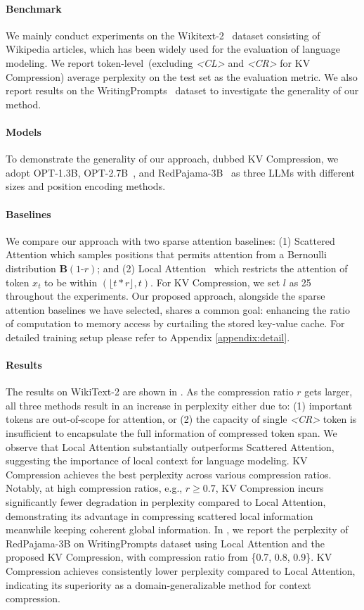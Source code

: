 \paragraph{Benchmark} We mainly conduct experiments on the Wikitext-2~\cite{wikitext2} dataset consisting of Wikipedia articles, which has been widely used for the evaluation of language modeling. We report token-level~(excluding \textit{<CL>} and \textit{<CR>} for KV Compression) average perplexity on the test set as the evaluation metric. We also report results on the WritingPrompts~\cite{wp} dataset to investigate the generality of our method.
\paragraph{Models} To demonstrate the generality of our approach, dubbed KV Compression, we adopt OPT-1.3B, OPT-2.7B~\cite{opt}, and RedPajama-3B~\cite{redpajama} as three LLMs with different sizes and position encoding methods.
\paragraph{Baselines} We compare our approach with two sparse attention baselines: (1) Scattered Attention which samples positions that permits attention from a Bernoulli distribution $\bm{B}(\text{1-}r)$; and (2) Local Attention~\cite{longformer} which restricts the attention of token $x_t$ to be within $(\lfloor t*r \rfloor,t)$. For KV Compression, we set $l$ as 25 throughout the experiments. Our proposed approach, alongside the sparse attention baselines we have selected, shares a common goal: enhancing the ratio of computation to memory access by curtailing the stored key-value cache. For detailed training setup please refer to Appendix \ref{appendix:detail}.
\paragraph{Results} The results on WikiText-2 are shown in . As the compression ratio $r$ gets larger, all three methods result in an increase in perplexity either due to: (1) important tokens are out-of-scope for attention, or (2) the capacity of single \textit{<CR>} token is insufficient to encapsulate the full information of compressed token span. We observe that Local Attention substantially outperforms Scattered Attention, suggesting the importance of local context for language modeling. KV Compression achieves the best perplexity across various compression ratios. Notably, at high compression ratios, e.g., $r\geq 0.7$, KV Compression incurs significantly fewer degradation in perplexity compared to Local Attention, demonstrating its advantage in compressing scattered local information meanwhile keeping coherent global information. In , we report the perplexity of RedPajama-3B on WritingPrompts dataset using Local Attention and the proposed KV Compression, with compression ratio from \{0.7, 0.8, 0.9\}. KV Compression achieves consistently lower perplexity compared to Local Attention, indicating its superiority as a domain-generalizable method for context compression.




